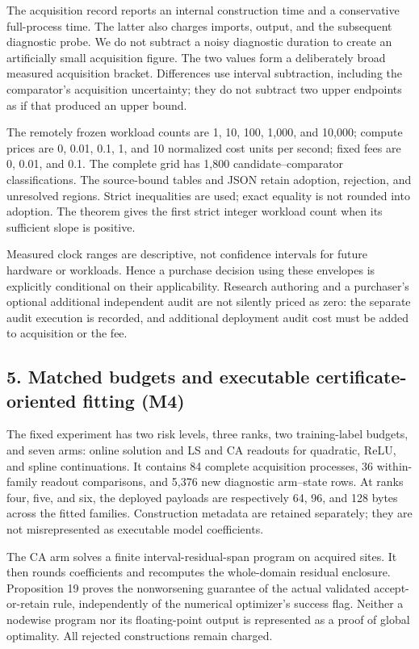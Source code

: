 The acquisition record reports an internal construction time and a
conservative full-process time. The latter also charges imports, output,
and the subsequent diagnostic probe. We do not subtract a noisy
diagnostic duration to create an artificially small acquisition figure.
The two values form a deliberately broad measured acquisition bracket.
Differences use interval subtraction, including the comparator's
acquisition uncertainty; they do not subtract two upper endpoints as if
that produced an upper bound.

The remotely frozen workload counts are 1, 10, 100, 1,000, and 10,000;
compute prices are 0, 0.01, 0.1, 1, and 10 normalized cost units per
second; fixed fees are 0, 0.01, and 0.1. The complete grid has 1,800
candidate--comparator classifications. The source-bound tables and JSON
retain adoption, rejection, and unresolved regions. Strict inequalities
are used; exact equality is not rounded into adoption. The theorem gives
the first strict integer workload count when its sufficient slope is
positive.

Measured clock ranges are descriptive, not confidence intervals for
future hardware or workloads. Hence a purchase decision using these
envelopes is explicitly conditional on their applicability. Research
authoring and a purchaser's optional additional independent audit are
not silently priced as zero: the separate audit execution is recorded,
and additional deployment audit cost must be added to acquisition or the
fee.

\hypertarget{matched-budgets-and-executable-certificate-oriented-fitting-m4}{%
\subsection{5. Matched budgets and executable certificate-oriented
fitting
(M4)}\label{matched-budgets-and-executable-certificate-oriented-fitting-m4}}

The fixed experiment has two risk levels, three ranks, two
training-label budgets, and seven arms: online solution and LS and CA
readouts for quadratic, ReLU, and spline continuations. It contains 84
complete acquisition processes, 36 within-family readout comparisons,
and 5,376 new diagnostic arm--state rows. At ranks four, five, and six,
the deployed payloads are respectively 64, 96, and 128 bytes across the
fitted families. Construction metadata are retained separately; they are
not misrepresented as executable model coefficients.

The CA arm solves a finite interval-residual-span program on acquired
sites. It then rounds coefficients and recomputes the whole-domain
residual enclosure. Proposition 19 proves the nonworsening guarantee of
the actual validated accept-or-retain rule, independently of the
numerical optimizer's success flag. Neither a nodewise program nor its
floating-point output is represented as a proof of global optimality.
All rejected constructions remain charged.

